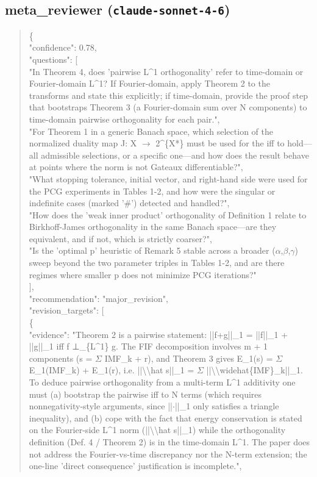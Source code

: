 \documentclass[11pt]{article}
\begin{document}
\subsection*{meta\_reviewer (\texttt{claude-sonnet-4-6})}
\begin{quote}\small\ttfamily\raggedright
\{\\
  "confidence": 0.78,\\
  "questions": [\\
    "In Theorem 4, does 'pairwise L\^{}1 orthogonality' refer to time-domain or Fourier-domain L\^{}1? If Fourier-domain, apply Theorem 2 to the transforms and state this explicitly; if time-domain, provide the proof step that bootstraps Theorem 3 (a Fourier-domain sum over N components) to time-domain pairwise orthogonality for each pair.",\\
    "For Theorem 1 in a generic Banach space, which selection of the normalized duality map J: X \ensuremath{\to} 2\^{}\{X*\} must be used for the iff to hold---all admissible selections, or a specific one---and how does the result behave at points where the norm is not Gateaux differentiable?",\\
    "What stopping tolerance, initial vector, and right-hand side were used for the PCG experiments in Tables 1-2, and how were the singular or indefinite cases (marked '\#') detected and handled?",\\
    "How does the 'weak inner product' orthogonality of Definition 1 relate to Birkhoff-James orthogonality in the same Banach space---are they equivalent, and if not, which is strictly coarser?",\\
    "Is the 'optimal p' heuristic of Remark 5 stable across a broader (\ensuremath{\alpha},\ensuremath{\beta},\ensuremath{\gamma}) sweep beyond the two parameter triples in Tables 1-2, and are there regimes where smaller p does not minimize PCG iterations?"\\
  ],\\
  "recommendation": "major\_revision",\\
  "revision\_targets": [\\
    \{\\
      "evidence": "Theorem 2 is a pairwise statement: ||f+g||\_1 = ||f||\_1 + ||g||\_1 iff f ⊥\_\{L\^{}1\} g. The FIF decomposition involves m + 1 components (s = \ensuremath{\Sigma} IMF\_k + r), and Theorem 3 gives E\_1(s) = \ensuremath{\Sigma} E\_1(IMF\_k) + E\_1(r), i.e. ||\textbackslash{}\textbackslash{}hat s||\_1 = \ensuremath{\Sigma} ||\textbackslash{}\textbackslash{}widehat\{IMF\}\_k||\_1. To deduce pairwise orthogonality from a multi-term L\^{}1 additivity one must (a) bootstrap the pairwise iff to N terms (which requires nonnegativity-style arguments, since ||\ensuremath{\cdot}||\_1 only satisfies a triangle inequality), and (b) cope with the fact that energy conservation is stated on the Fourier-side L\^{}1 norm (||\textbackslash{}\textbackslash{}hat s||\_1) while the orthogonality definition (Def. 4 / Theorem 2) is in the time-domain L\^{}1. The paper does not address the Fourier-vs-time discrepancy nor the N-term extension; the one-line 'direct consequence' justification is incomplete.",\\

\end{quote}
\end{document}
